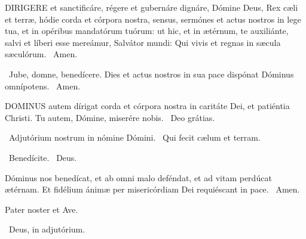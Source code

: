 \lettrine[lines=2]{D}{IRIGERE} et sanctificáre, régere et gubernáre dignáre, Dómine Deus, Rex cæli et terræ, hódie corda et córpora nostra, sensus, sermónes et actus nostros in lege tua, et in opéribus mandatórum tuórum: ut hic, et in ætérnum, te auxiliánte, salvi et líberi esse mereámur, Salvátor mundi: Qui vivis et regnas in sæcula sæculórum. \R\ Amen.


\V\ Jube, domne, benedícere.  Dies et actus nostros in sua pace dispónat Dóminus omnípotens. \R\ Amen.




\lettrine[lines=2]{D}{OMINUS} autem dírigat corda et córpora nostra in caritáte Dei, et patiéntia Christi. Tu autem, Dómine, miserére nobis. \R\ Deo grátias.





\V\ Adjutórium nostrum in nómine Dómini. \R\ Qui fecit cælum et terram.

\V\ Benedícite. \R\ Deus.

 Dóminus nos benedícat, et ab omni malo deféndat, et ad vitam perdúcat ætérnam. Et fidélium ánimæ per misericórdiam Dei requiéscant in pace. \R\ Amen.



Pater noster et Ave.

\V\ Deus, in adjutórium.


